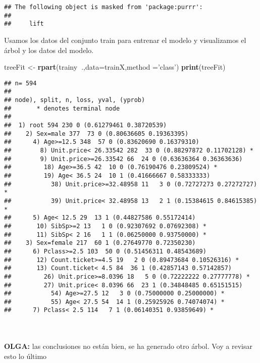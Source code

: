 \documentclass[
]{article}
\newenvironment{Shaded}{\begin{snugshade}}{\end{snugshade}}
\newcommand{\DataTypeTok}[1]{\textcolor[rgb]{0.13,0.29,0.53}{#1}}
\newcommand{\KeywordTok}[1]{\textcolor[rgb]{0.13,0.29,0.53}{\textbf{#1}}}
\newcommand{\NormalTok}[1]{#1}
\newcommand{\OperatorTok}[1]{\textcolor[rgb]{0.81,0.36,0.00}{\textbf{#1}}}
\newcommand{\StringTok}[1]{\textcolor[rgb]{0.31,0.60,0.02}{#1}}
\begin{document}
\begin{verbatim}
## The following object is masked from 'package:purrr':
## 
##     lift
\end{verbatim}

\texttt{}

Usamos los datos del conjunto train para entrenar el modelo y
visualizamos el árbol y los datos del modelo.\\
\texttt{}

\begin{Shaded}
\begin{Highlighting}[]
\NormalTok{treeFit <-}\StringTok{ }\KeywordTok{rpart}\NormalTok{(trainy}\OperatorTok{~}\NormalTok{.,}\DataTypeTok{data=}\NormalTok{trainX,}\DataTypeTok{method =}\StringTok{'class'}\NormalTok{)}
\KeywordTok{print}\NormalTok{(treeFit)}
\end{Highlighting}
\end{Shaded}

\begin{verbatim}
## n= 594 
## 
## node), split, n, loss, yval, (yprob)
##       * denotes terminal node
## 
##  1) root 594 230 0 (0.61279461 0.38720539)  
##    2) Sex=male 377  73 0 (0.80636605 0.19363395)  
##      4) Age>=12.5 348  57 0 (0.83620690 0.16379310)  
##        8) Unit.price< 26.33542 282  33 0 (0.88297872 0.11702128) *
##        9) Unit.price>=26.33542 66  24 0 (0.63636364 0.36363636)  
##         18) Age>=36.5 42  10 0 (0.76190476 0.23809524) *
##         19) Age< 36.5 24  10 1 (0.41666667 0.58333333)  
##           38) Unit.price>=32.48958 11   3 0 (0.72727273 0.27272727) *
##           39) Unit.price< 32.48958 13   2 1 (0.15384615 0.84615385) *
##      5) Age< 12.5 29  13 1 (0.44827586 0.55172414)  
##       10) SibSp>=2 13   1 0 (0.92307692 0.07692308) *
##       11) SibSp< 2 16   1 1 (0.06250000 0.93750000) *
##    3) Sex=female 217  60 1 (0.27649770 0.72350230)  
##      6) Pclass>=2.5 103  50 0 (0.51456311 0.48543689)  
##       12) Count.ticket>=4.5 19   2 0 (0.89473684 0.10526316) *
##       13) Count.ticket< 4.5 84  36 1 (0.42857143 0.57142857)  
##         26) Unit.price>=8.0396 18   5 0 (0.72222222 0.27777778) *
##         27) Unit.price< 8.0396 66  23 1 (0.34848485 0.65151515)  
##           54) Age>=27.5 12   3 0 (0.75000000 0.25000000) *
##           55) Age< 27.5 54  14 1 (0.25925926 0.74074074) *
##      7) Pclass< 2.5 114   7 1 (0.06140351 0.93859649) *
\end{verbatim}

\texttt{}~\\
\texttt{}~\\
\textbf{OLGA:} las conclusiones no están bien, se ha generado otro
árbol. Voy a revisar esto lo último
\end{document}
